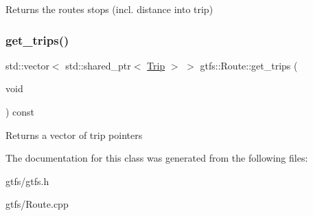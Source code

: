 \begin{DoxyReturn}{Returns}
the route\textquotesingle{}s stops (incl. distance into trip) 
\end{DoxyReturn}
\mbox{\label{classgtfs_1_1Route_a763ea7a09f20972019198515da6a1c05}} 
\subsubsection{\texorpdfstring{get\+\_\+trips()}{get\_trips()}}
{\footnotesize\ttfamily std\+::vector$<$ std\+::shared\+\_\+ptr$<$ \hyperlink{classgtfs_1_1Trip}{Trip} $>$ $>$ gtfs\+::\+Route\+::get\+\_\+trips (\begin{DoxyParamCaption}\item[{void}]{ }\end{DoxyParamCaption}) const}

\begin{DoxyReturn}{Returns}
a vector of trip pointers 
\end{DoxyReturn}


The documentation for this class was generated from the following files\+:\begin{DoxyCompactItemize}
\item 
gtfs/gtfs.\+h\item 
gtfs/Route.\+cpp\end{DoxyCompactItemize}
